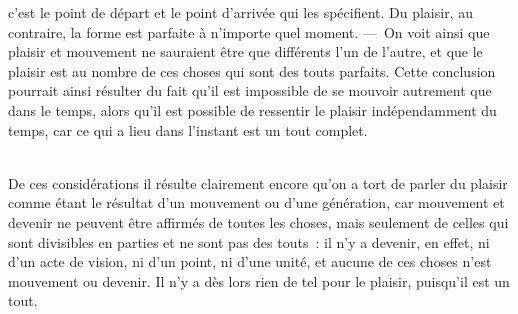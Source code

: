 \documentclass[french,twoside]{book} %
\begin{document}
c’est le point de départ et le point d’arrivée qui les spécifient. Du plaisir, au contraire, la forme est parfaite à n’importe quel moment. — On voit ainsi que plaisir et mouvement ne sauraient être que différents l’un de l’autre, et que le plaisir est au nombre de ces choses qui sont des touts parfaits. Cette conclusion pourrait ainsi résulter du fait qu’il est impossible de se mouvoir autrement que dans le temps, alors qu’il est possible de ressentir le plaisir indépendamment du temps, car ce qui a lieu dans l’instant est un tout complet.\par
\\
De ces considérations il résulte clairement encore qu’on a tort de parler du plaisir comme étant le résultat d’un mouvement ou d’une génération, car mouvement et devenir ne peuvent être affirmés de toutes les choses, mais seulement de celles qui sont divisibles en parties et ne sont pas des touts : il n’y a devenir, en effet, ni d’un acte de vision, ni d’un point, ni d’une unité, et aucune de ces choses n’est mouvement ou devenir. Il n’y a dès lors rien de tel pour le plaisir, puisqu’il est un tout.
\end{document}
